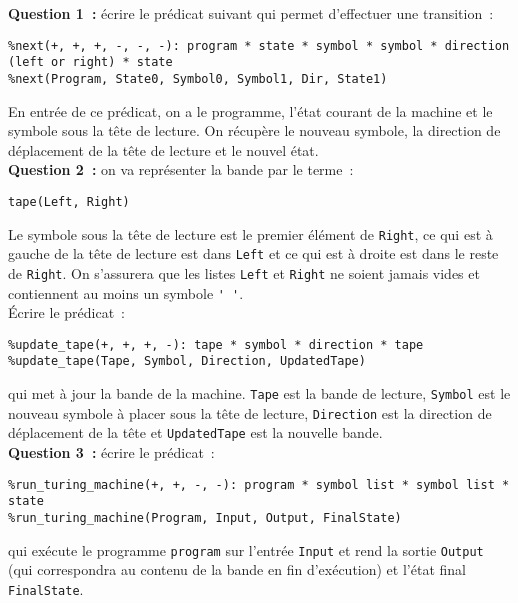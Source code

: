 \documentclass[a4paper]{article}
\begin{document}
\indent\textbf{Question 1~:} écrire le prédicat suivant qui permet d'effectuer une transition~:
\begin{verbatim}
%next(+, +, +, -, -, -): program * state * symbol * symbol * direction (left or right) * state
%next(Program, State0, Symbol0, Symbol1, Dir, State1)
\end{verbatim}

\noindent En entrée de ce prédicat, on a le programme, l'état courant de la machine et le symbole sous la tête de lecture. On récupère le nouveau
symbole, la direction de déplacement de la tête de lecture et le nouvel état.\\

\indent\textbf{Question 2~:} on va représenter la bande par le terme~:
\begin{verbatim}
tape(Left, Right)
\end{verbatim}

\noindent Le symbole sous la tête de lecture est le premier élément de \texttt{Right}, ce qui est à gauche de la tête de lecture est dans \texttt{Left} et ce qui
est à droite est dans le reste de \texttt{Right}. On s'assurera que les listes \texttt{Left} et \texttt{Right} ne soient jamais vides et contiennent au moins un symbole \verb+' '+.\\

\'Ecrire le prédicat~:
\begin{verbatim}
%update_tape(+, +, +, -): tape * symbol * direction * tape 
%update_tape(Tape, Symbol, Direction, UpdatedTape)
\end{verbatim}
qui met à jour la bande de la machine. \texttt{Tape} est la bande de lecture, 
\texttt{Symbol} est le nouveau symbole à placer sous la tête de lecture, \texttt{Direction} est la direction de déplacement de la tête et 
\texttt{UpdatedTape} est la nouvelle bande.\\

\indent\textbf{Question 3~:} écrire le prédicat~:
\begin{verbatim}
%run_turing_machine(+, +, -, -): program * symbol list * symbol list * state 
%run_turing_machine(Program, Input, Output, FinalState)
\end{verbatim}

\noindent qui exécute le programme \texttt{program} sur l'entrée \texttt{Input} et rend la sortie \texttt{Output} (qui correspondra au contenu de la bande en fin d'exécution) et
l'état final \texttt{FinalState}.\\
\end{document}
